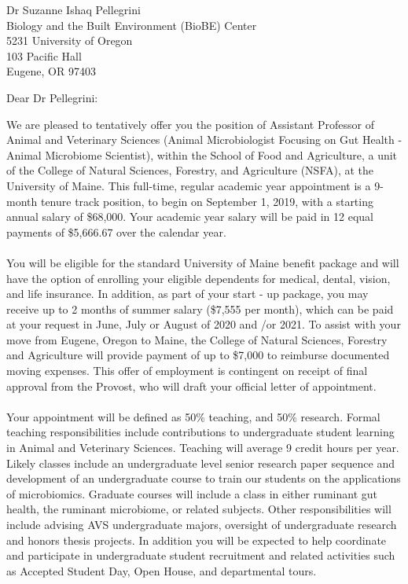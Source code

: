 \documentclass[a4paper,11pt]{letter}
\begin{document}
\begin{letter}{Dr Suzanne Ishaq Pellegrini\\Biology and the Built Environment (BioBE) Center\\5231 University of Oregon\\103 Pacific Hall\\Eugene, OR 97403}
\opening{Dear Dr Pellegrini:} %
We are pleased to tentatively offer you the position of Assistant Professor of Animal and Veterinary Sciences (Animal Microbiologist Focusing on Gut Health - Animal Microbiome Scientist), within the School of Food and Agriculture, a unit of the College of Natural Sciences, Forestry, and Agriculture (NSFA), at the University of Maine. This full-time, regular academic year appointment is a 9-month tenure track position, to begin on September 1, 2019, with a starting annual salary of \$68,000. Your academic year salary will be paid in 12 equal payments of \$5,666.67 over the calendar year.\\~\\
You will be eligible for the standard University of Maine benefit package and will have the option of enrolling your eligible dependents for medical, dental, vision, and life insurance. In addition, as part of your start - up package, you may receive up to 2 months of summer salary (\$7,555 per month), which can be paid at your request in June, July or August of 2020 and /or 2021. To assist with your move from Eugene, Oregon to Maine, the College of Natural Sciences, Forestry and Agriculture will provide payment of up to \$7,000 to reimburse documented moving expenses. This offer of employment is contingent on receipt of final approval from the Provost, who will draft your official letter of appointment. 
\\~\\
Your appointment will be defined as 50\% teaching, and 50\% research. Formal teaching responsibilities include contributions to undergraduate student learning in Animal and Veterinary Sciences.  Teaching will average 9 credit hours per year. Likely classes include an undergraduate level senior research paper sequence and development of an undergraduate course to train our students on the applications of microbiomics. Graduate courses will include a class in either ruminant gut health, the ruminant microbiome, or related subjects. Other responsibilities will include advising AVS undergraduate majors, oversight of undergraduate research and honors thesis projects. In addition you will be expected to help coordinate and participate in undergraduate student recruitment and related activities such as Accepted Student Day, Open House, and departmental tours.\\~\\

\end{letter}
\end{document}
